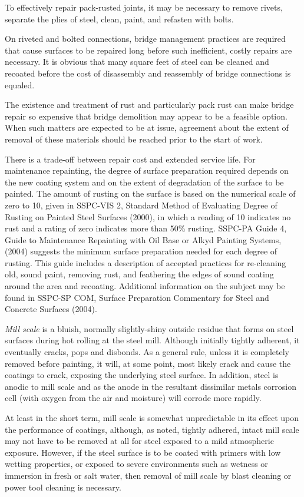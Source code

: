 To effectively repair pack-rusted joints, it may be necessary to remove rivets, separate the plies of steel, clean,
paint, and refasten with bolts.

On riveted and bolted connections, bridge management practices are required that cause surfaces to be repaired
long before such inefficient, costly repairs are necessary. It is obvious that many square feet of steel can be cleaned
and recoated before the cost of disassembly and reassembly of bridge connections is equaled.

The existence and treatment of rust and particularly pack rust can make bridge repair so expensive that bridge
demolition may appear to be a feasible option. When such matters are expected to be at issue, agreement about the
extent of removal of these materials should be reached prior to the start of work.

There is a trade-off between repair cost and extended service life. For maintenance repainting, the degree of
surface preparation required depends on the new coating system and on the extent of degradation of the surface to be
painted. The amount of rusting on the surface is based on the numerical scale of zero to 10, given in SSPC-VIS 2,
Standard Method of Evaluating Degree of Rusting on Painted Steel Surfaces (2000), in which a reading of 10
indicates no rust and a rating of zero indicates more than 50\% rusting. SSPC-PA Guide 4, Guide to Maintenance
Repainting with Oil Base or Alkyd Painting Systems, (2004) suggests the minimum surface preparation needed for
each degree of rusting. This guide includes a description of accepted practices for re-cleaning old, sound paint,
removing rust, and feathering the edges of sound coating around the area and recoating. Additional information on the subject may be found in SSPC-SP COM, Surface Preparation Commentary for Steel and Concrete Surfaces
(2004).

\emph{Mill scale} is a bluish, normally slightly-shiny outside residue that forms on steel surfaces during hot rolling at the
steel mill. Although initially tightly adherent, it eventually cracks, pops and disbonds. As a general rule, unless it is
completely removed before painting, it will, at some point, most likely crack and cause the coatings to crack,
exposing the underlying steel surface. In addition, steel is anodic to mill scale and as the anode in the resultant
dissimilar metals corrosion cell (with oxygen from the air and moisture) will corrode more rapidly.

At least in the short term, mill scale is somewhat unpredictable in its effect upon the performance of coatings,
although, as noted, tightly adhered, intact mill scale may not have to be removed at all for steel exposed to a mild
atmospheric exposure. However, if the steel surface is to be coated with primers with low wetting properties, or
exposed to severe environments such as wetness or immersion in fresh or salt water, then removal of mill scale by
blast cleaning or power tool cleaning is necessary.

